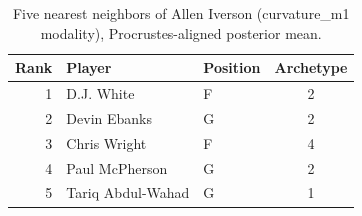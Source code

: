 \begin{table}[htbp]
  \centering\small
  \begin{tabular}{rllc}
    \toprule
    Rank & Player & Position & Archetype \\
    \midrule
    1 & D.J. White & F & 2 \\
    2 & Devin Ebanks & G & 2 \\
    3 & Chris Wright & F & 4 \\
    4 & Paul McPherson & G & 2 \\
    5 & Tariq Abdul-Wahad & G & 1 \\
    \bottomrule
  \end{tabular}
  \caption{Five nearest neighbors of Allen Iverson (curvature_m1 modality), Procrustes-aligned posterior mean.}
  \label{tab:Allen_Iverson_neighbors_curvature_m1}
\end{table}

